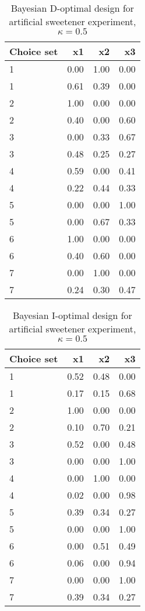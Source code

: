 \begin{table}[ht]
\centering
\begin{tabular}{lrrr}
  \hline
Choice set & x1 & x2 & x3 \\ 
  \hline
1 & 0.00 & 1.00 & 0.00 \\ 
  1 & 0.61 & 0.39 & 0.00 \\ 
  2 & 1.00 & 0.00 & 0.00 \\ 
  2 & 0.40 & 0.00 & 0.60 \\ 
  3 & 0.00 & 0.33 & 0.67 \\ 
  3 & 0.48 & 0.25 & 0.27 \\ 
  4 & 0.59 & 0.00 & 0.41 \\ 
  4 & 0.22 & 0.44 & 0.33 \\ 
  5 & 0.00 & 0.00 & 1.00 \\ 
  5 & 0.00 & 0.67 & 0.33 \\ 
  6 & 1.00 & 0.00 & 0.00 \\ 
  6 & 0.40 & 0.60 & 0.00 \\ 
  7 & 0.00 & 1.00 & 0.00 \\ 
  7 & 0.24 & 0.30 & 0.47 \\ 
   \hline
\end{tabular}
\caption{Bayesian D-optimal design for artificial sweetener experiment, $\kappa = 0.5$} 
\label{tab:cornell_exp_d_optimal_des_kappa_0.5}
\end{table}
\begin{table}[ht]
\centering
\begin{tabular}{lrrr}
  \hline
Choice set & x1 & x2 & x3 \\ 
  \hline
1 & 0.52 & 0.48 & 0.00 \\ 
  1 & 0.17 & 0.15 & 0.68 \\ 
  2 & 1.00 & 0.00 & 0.00 \\ 
  2 & 0.10 & 0.70 & 0.21 \\ 
  3 & 0.52 & 0.00 & 0.48 \\ 
  3 & 0.00 & 0.00 & 1.00 \\ 
  4 & 0.00 & 1.00 & 0.00 \\ 
  4 & 0.02 & 0.00 & 0.98 \\ 
  5 & 0.39 & 0.34 & 0.27 \\ 
  5 & 0.00 & 0.00 & 1.00 \\ 
  6 & 0.00 & 0.51 & 0.49 \\ 
  6 & 0.06 & 0.00 & 0.94 \\ 
  7 & 0.00 & 0.00 & 1.00 \\ 
  7 & 0.39 & 0.34 & 0.27 \\ 
   \hline
\end{tabular}
\caption{Bayesian I-optimal design for artificial sweetener experiment, $\kappa = 0.5$} 
\label{tab:cornell_exp_i_optimal_des_kappa_0.5}
\end{table}
